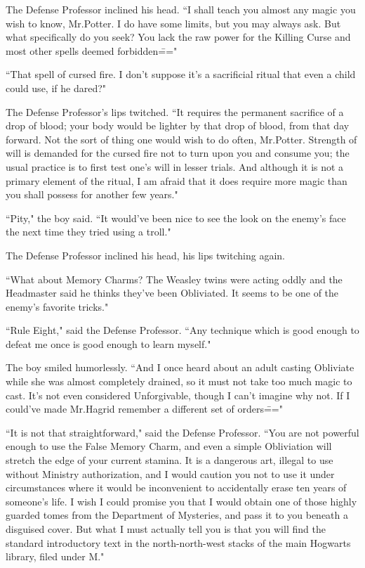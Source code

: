 The Defense Professor inclined his head. ``I shall teach you almost any magic you wish to know, Mr.\?Potter. I do have some limits, but you may always ask. But what specifically do you seek? You lack the raw power for the Killing Curse and most other spells deemed forbidden\==="

``That spell of cursed fire. I don't suppose it's a sacrificial ritual that even a child could use, if he dared?"

The Defense Professor's lips twitched. ``It requires the permanent sacrifice of a drop of blood; your body would be lighter by that drop of blood, from that day forward. Not the sort of thing one would wish to do often, Mr.\?Potter. Strength of will is demanded for the cursed fire not to turn upon you and consume you; the usual practice is to first test one's will in lesser trials. And although it is not a primary element of the ritual, I am afraid that it does require more magic than you shall possess for another few years."

``Pity," the boy said. ``It would've been nice to see the look on the enemy's face the next time they tried using a troll."

The Defense Professor inclined his head, his lips twitching again.

``What about Memory Charms? The Weasley twins were acting oddly and the Headmaster said he thinks they've been Obliviated. It seems to be one of the enemy's favorite tricks."

``Rule Eight," said the Defense Professor. ``Any technique which is good enough to defeat me once is good enough to learn myself."

The boy smiled humorlessly. ``And I once heard about an adult casting Obliviate while she was almost completely drained, so it must not take too much magic to cast. It's not even considered Unforgivable, though I can't imagine why not. If I could've made Mr.\?Hagrid remember a different set of orders\==="

``It is not that straightforward," said the Defense Professor. ``You are not powerful enough to use the False Memory Charm, and even a simple Obliviation will stretch the edge of your current stamina. It is a dangerous art, illegal to use without Ministry authorization, and I would caution you not to use it under circumstances where it would be inconvenient to accidentally erase ten years of someone's life. I wish I could promise you that I would obtain one of those highly guarded tomes from the Department of Mysteries, and pass it to you beneath a disguised cover. But what I must actually tell you is that you will find the standard introductory text in the north-north-west stacks of the main Hogwarts library, filed under M."

